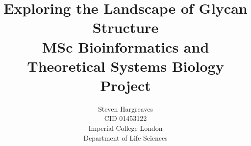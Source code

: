 \documentclass[12pt,a4paper]{article}
\begin{document}
{\selectfont}
\title{\Huge Exploring the Landscape of Glycan Structure\vspace{1cm}\\ \large  MSc Bioinformatics and Theoretical Systems Biology Project\vspace{11cm}}
\date{}

\author{\Large Steven Hargreaves\\
\normalsize CID 01453122 \\\vspace{0.5cm}
\normalsize Imperial College London \\
\normalsize Department of Life Sciences}
\end{document}
